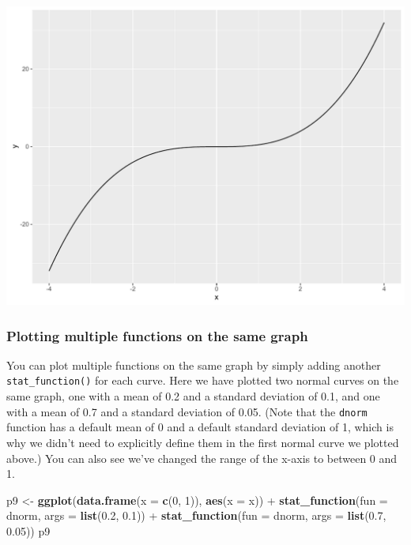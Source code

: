 \documentclass[]{article}
\newenvironment{Shaded}{\begin{snugshade}}{\end{snugshade}}
\newcommand{\KeywordTok}[1]{\textcolor[rgb]{0.13,0.29,0.53}{\textbf{{#1}}}}
\newcommand{\DataTypeTok}[1]{\textcolor[rgb]{0.13,0.29,0.53}{{#1}}}
\newcommand{\DecValTok}[1]{\textcolor[rgb]{0.00,0.00,0.81}{{#1}}}
\newcommand{\FloatTok}[1]{\textcolor[rgb]{0.00,0.00,0.81}{{#1}}}
\newcommand{\StringTok}[1]{\textcolor[rgb]{0.31,0.60,0.02}{{#1}}}
\newcommand{\NormalTok}[1]{{#1}}
\begin{document}
\begin{center}\includegraphics{0_all_posts_pdf/function_3-1} \end{center}

\subsubsection{Plotting multiple functions on the same
graph}\label{plotting-multiple-functions-on-the-same-graph}

You can plot multiple functions on the same graph by simply adding
another \texttt{stat\_function()} for each curve. Here we have plotted
two normal curves on the same graph, one with a mean of 0.2 and a
standard deviation of 0.1, and one with a mean of 0.7 and a standard
deviation of 0.05. (Note that the \texttt{dnorm} function has a default
mean of 0 and a default standard deviation of 1, which is why we didn't
need to explicitly define them in the first normal curve we plotted
above.) You can also see we've changed the range of the x-axis to
between 0 and 1.

\begin{Shaded}
\begin{Highlighting}[]
\NormalTok{p9 <-}\StringTok{ }\KeywordTok{ggplot}\NormalTok{(}\KeywordTok{data.frame}\NormalTok{(}\DataTypeTok{x =} \KeywordTok{c}\NormalTok{(}\DecValTok{0}\NormalTok{, }\DecValTok{1}\NormalTok{)), }\KeywordTok{aes}\NormalTok{(}\DataTypeTok{x =} \NormalTok{x)) +}
\StringTok{      }\KeywordTok{stat_function}\NormalTok{(}\DataTypeTok{fun =} \NormalTok{dnorm, }\DataTypeTok{args =} \KeywordTok{list}\NormalTok{(}\FloatTok{0.2}\NormalTok{, }\FloatTok{0.1}\NormalTok{)) +}
\StringTok{      }\KeywordTok{stat_function}\NormalTok{(}\DataTypeTok{fun =} \NormalTok{dnorm, }\DataTypeTok{args =} \KeywordTok{list}\NormalTok{(}\FloatTok{0.7}\NormalTok{, }\FloatTok{0.05}\NormalTok{))}
\NormalTok{p9}
\end{Highlighting}
\end{Shaded}
\end{document}
